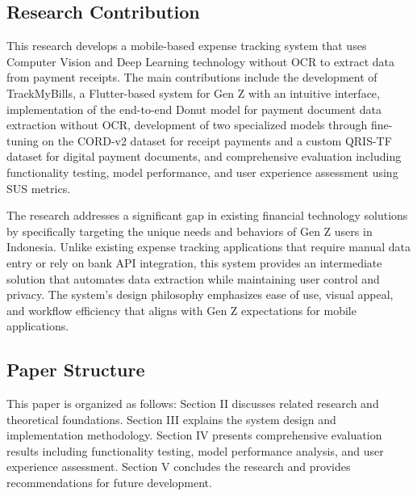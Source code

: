 \subsection{Research Contribution}
This research develops a mobile-based expense tracking system that uses Computer Vision and Deep Learning technology without OCR to extract data from payment receipts. The main contributions include the development of TrackMyBills, a Flutter-based system for Gen Z with an intuitive interface, implementation of the end-to-end Donut model for payment document data extraction without OCR, development of two specialized models through fine-tuning on the CORD-v2 dataset for receipt payments and a custom QRIS-TF dataset for digital payment documents, and comprehensive evaluation including functionality testing, model performance, and user experience assessment using SUS metrics.

The research addresses a significant gap in existing financial technology solutions by specifically targeting the unique needs and behaviors of Gen Z users in Indonesia. Unlike existing expense tracking applications that require manual data entry or rely on bank API integration, this system provides an intermediate solution that automates data extraction while maintaining user control and privacy. The system's design philosophy emphasizes ease of use, visual appeal, and workflow efficiency that aligns with Gen Z expectations for mobile applications.

\subsection{Paper Structure}
This paper is organized as follows: Section II discusses related research and theoretical foundations. Section III explains the system design and implementation methodology. Section IV presents comprehensive evaluation results including functionality testing, model performance analysis, and user experience assessment. Section V concludes the research and provides recommendations for future development.